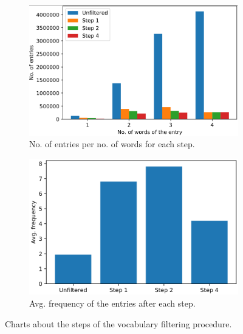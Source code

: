 \begin{figure}
  \begin{subfigure}[t]{0.5\textwidth}
    \centering
    \includegraphics[width=\textwidth]{figures/vocab/after/words_per_entry_per_step.PNG}
    \caption{No. of entries per no. of words for each step.}
    \label{fig:words_per_entry_per_step}
  \end{subfigure}
  \hfill
  \begin{subfigure}[t]{0.48\textwidth}
    \centering
    \includegraphics[width=\textwidth]{figures/vocab/after/avg_frequency_per_step.PNG}
    \caption{Avg. frequency of the entries after each step.}
    \label{fig:avg_frequency_per_step}
  \end{subfigure}
  \caption{Charts about the steps of the vocabulary filtering procedure.}
\end{figure}

